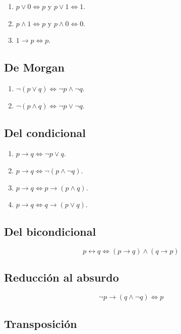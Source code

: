 \begin{enumerate}
 \item $p \vee 0 \Leftrightarrow p$ y $p \vee 1 \Leftrightarrow 1$.
 \item $p \wedge 1 \Leftrightarrow p$ y $p \wedge 0 \Leftrightarrow 0$.
 \item $1 \rightarrow p \Leftrightarrow p$.
\end{enumerate}

\subsection{De Morgan}

\begin{enumerate}
 \item $\neg (p \vee q) \Leftrightarrow \neg p \wedge \neg q$.
 \item $\neg (p \wedge q) \Leftrightarrow \neg p \vee \neg q$.
\end{enumerate}

\subsection{Del condicional}

\begin{enumerate}
 \item $p \rightarrow q \Leftrightarrow \neg p \vee q$.
 \item $p \rightarrow q \Leftrightarrow \neg (p \wedge \neg q)$.
 \item $p \rightarrow q \Leftrightarrow p \rightarrow (p \wedge q)$.
 \item $p \rightarrow q \Leftrightarrow q \rightarrow (p \vee q)$.
\end{enumerate}

\subsection{Del bicondicional}

\[
 p \leftrightarrow q \Leftrightarrow (p \rightarrow q) \wedge (q \rightarrow p)
\]

\subsection{Reducción al absurdo}

\[
 \neg p \rightarrow (q \wedge \neg q) \Leftrightarrow p
\]

\subsection{Transposición}

